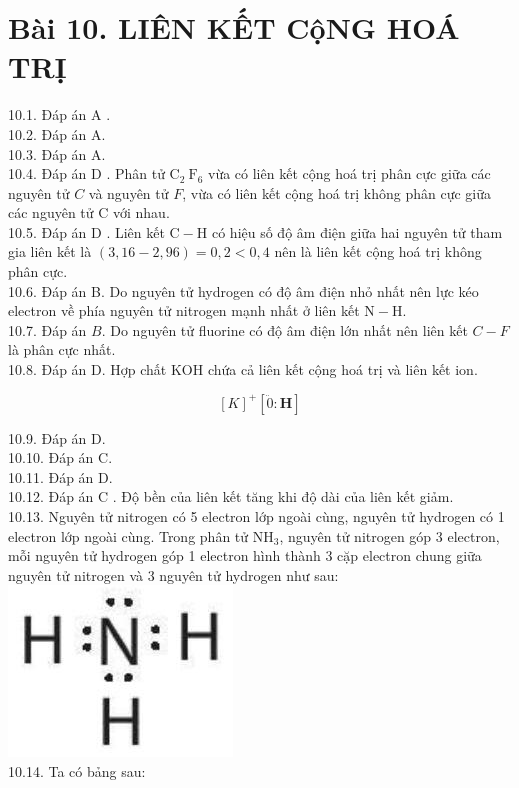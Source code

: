 \documentclass[10pt]{article}
\begin{document}
\section*{Bài 10. LIÊN KẾT CộNG HOÁ TRỊ}
10.1. Đáp án A .\\
10.2. Đáp án A.\\
10.3. Đáp án A.\\
10.4. Đáp án D . Phân tử $\mathrm{C}_{2} \mathrm{~F}_{6}$ vừa có liên kết cộng hoá trị phân cực giữa các nguyên tử $C$ và nguyên tử $F$, vừa có liên kết cộng hoá trị không phân cực giữa các nguyên tử C với nhau.\\
10.5. Đáp án D . Liên kết $\mathrm{C}-\mathrm{H}$ có hiệu số độ âm điện giữa hai nguyên tử tham gia liên kết là $(3,16-2,96)=0,2<0,4$ nên là liên kết cộng hoá trị không phân cực.\\
10.6. Đáp án B. Do nguyên tử hydrogen có độ âm điện nhỏ nhất nên lực kéo electron về phía nguyên tử nitrogen mạnh nhất ở liên kết $\mathrm{N}-\mathrm{H}$.\\
10.7. Đáp án $B$. Do nguyên tử fluorine có độ âm điện lớn nhất nên liên kết $C-F$ là phân cực nhất.\\
10.8. Đáp án D. Hợp chất KOH chứa cả liên kết cộng hoá trị và liên kết ion.

$$
[K]^{+}[\ddot{0}: \mathbf{H}]
$$

10.9. Đáp án D.\\
10.10. Đáp án C.\\
10.11. Đáp án D.\\
10.12. Đáp án C . Độ bền của liên kết tăng khi độ dài của liên kết giảm.\\
10.13. Nguyên tử nitrogen có 5 electron lớp ngoài cùng, nguyên tử hydrogen có 1 electron lớp ngoài cùng. Trong phân tử $\mathrm{NH}_{3}$, nguyên tử nitrogen góp 3 electron, mỗi nguyên tử hydrogen góp 1 electron hình thành 3 cặp electron chung giữa nguyên tử nitrogen và 3 nguyên tử hydrogen như sau:\\
\includegraphics[max width=\textwidth, center]{2025_10_23_57761e23b8c46a11c3efg-24}\\
10.14. Ta có bảng sau:
\end{document}

